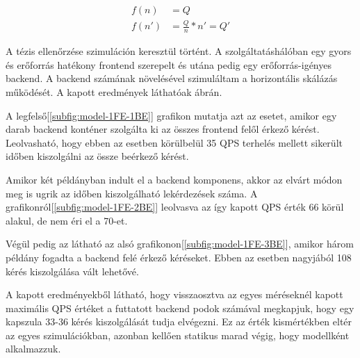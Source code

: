 \begin{equation} \label{eq:maxQPS}
\begin{split}
f(n) & = Q \\
f(n') & = \frac{Q}{n} * n' = Q' 
\end{split}
\end{equation}

A tézis ellenőrzése szimuláción keresztül történt.
A szolgáltatáshálóban egy gyors és erőforrás hatékony frontend szerepelt és utána pedig egy erőforrás-igényes backend. 
A backend számának növelésével szimuláltam a horizontális skálázás működését.
A kapott eredmények láthatóak  ábrán.

A legfelső[\ref{subfig:model-1FE-1BE}] grafikon mutatja azt az esetet, amikor egy darab backend konténer szolgálta ki az összes frontend felől érkező kérést.
Leolvasható, hogy ebben az esetben körülbelül 35 QPS terhelés mellett sikerült időben kiszolgálni az össze beérkező kérést.

Amikor két példányban indult el a backend komponens, akkor az elvárt módon meg is ugrik az időben kiszolgálható lekérdezések száma.
A grafikonról[\ref{subfig:model-1FE-2BE}] leolvasva az így kapott QPS érték 66 körül alakul, de nem éri el a 70-et.

Végül pedig az látható az alsó grafikonon[\ref{subfig:model-1FE-3BE}], amikor három példány fogadta a backend felé érkező kéréseket.
Ebben az esetben nagyjából 108 kérés kiszolgálása vált lehetővé.

A kapott eredményekből látható, hogy visszaosztva az egyes méréseknél kapott maximális QPS értéket a futtatott backend podok számával megkapjuk, hogy egy kapszula 33-36 kérés kiszolgálását tudja elvégezni.
Ez az érték kismértékben eltér az egyes szimulációkban, azonban kellően statikus marad végig, hogy modellként alkalmazzuk.


